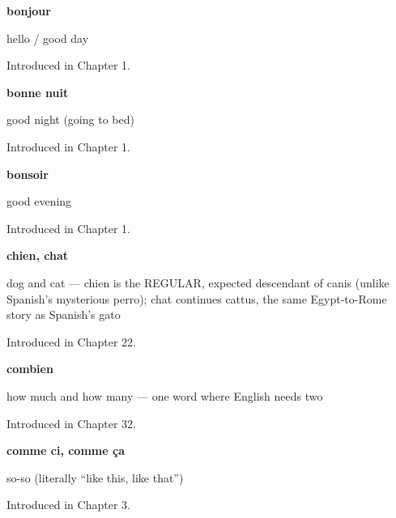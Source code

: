 \noindent\begin{minipage}[t]{\linewidth}
\raggedright
\textbf{bonjour}\par
\small hello / good day\par
\footnotesize Introduced in Chapter 1.
\end{minipage}\par\medskip

\noindent\begin{minipage}[t]{\linewidth}
\raggedright
\textbf{bonne nuit}\par
\small good night (going to bed)\par
\footnotesize Introduced in Chapter 1.
\end{minipage}\par\medskip

\noindent\begin{minipage}[t]{\linewidth}
\raggedright
\textbf{bonsoir}\par
\small good evening\par
\footnotesize Introduced in Chapter 1.
\end{minipage}\par\medskip

\noindent\begin{minipage}[t]{\linewidth}
\raggedright
\textbf{chien, chat}\par
\small dog and cat — chien is the REGULAR, expected descendant of canis (unlike Spanish's mysterious perro); chat continues cattus, the same Egypt-to-Rome story as Spanish's gato\par
\footnotesize Introduced in Chapter 22.
\end{minipage}\par\medskip

\noindent\begin{minipage}[t]{\linewidth}
\raggedright
\textbf{combien}\par
\small how much and how many — one word where English needs two\par
\footnotesize Introduced in Chapter 32.
\end{minipage}\par\medskip

\noindent\begin{minipage}[t]{\linewidth}
\raggedright
\textbf{comme ci, comme ça}\par
\small so-so (literally \textquotedblleft{}like this, like that\textquotedblright{})\par
\footnotesize Introduced in Chapter 3.
\end{minipage}\par\medskip

